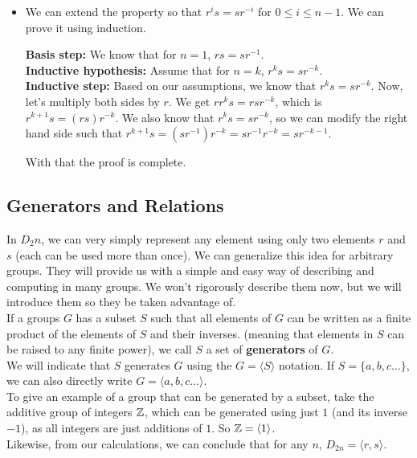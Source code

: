 \documentclass[12pt]{article}
\begin{document}
\begin{itemize}[label=$\diamond$]
        \item
            We can extend the property so that $r^is = sr^{-i}$
            for $0 \leqslant i \leqslant n-1$.
            We can prove it using induction. \\
            \begin{adjustwidth}{1cm}{1cm}
                \textbf{Basis step:}
                We know that for $n = 1$,
                $rs = sr^{-1}$. \\
                \textbf{Inductive hypothesis:}
                Assume that for $n = k$,
                $r^ks = sr^{-k}$. \\
                \textbf{Inductive step:}
                Based on our assumptions,
                we know that $r^ks = sr^{-k}$.
                Now, let's multiply both sides by $r$.
                We get $rr^ks = rsr^{-k}$,
                which is $r^{k+1}s = (rs)r^{-k}$.
                We also know that $r^ks = sr^{-k}$,
                so we can modify the right hand side such that
                $r^{k+1}s = (sr^{-1})r^{-k} = sr^{-1}r^{-k} = sr^{-k-1}$.
            \end{adjustwidth}
            With that the proof is complete. \\
    \end{itemize}


    \subsection*{Generators and Relations}

    In $D_2n$, we can very simply represent any element
    using only two elements $r$ and $s$
    (each can be used more than once).
    We can generalize this idea for arbitrary groups.
    They will provide us with a simple and easy way of describing
    and computing in many groups.
    We won't rigorously describe them now,
    but we will introduce them so they be taken advantage of. \\

    If a groups $G$ has a subset $S$
    such that all elements of $G$ can be written as a finite
    product of the elements of $S$ and their inverses.
    (meaning that elements in $S$ can be raised to any finite power),
    we call $S$ a set of \textbf{generators} of $G$. \\
    We will indicate that $S$ generates $G$ using
    the $G = \langle S \rangle$ notation.
    If $S = \{a, b, c \dots\}$,
    we can also directly write $G = \langle a, b, c \dots \rangle$. \\
    To give an example of a group that can be generated by a subset,
    take the additive group of integers $\mathbb{Z}$,
    which can be generated using just $1$ (and its inverse $-1$),
    as all integers are just additions of $1$.
    So $\mathbb{Z} = \langle 1 \rangle$. \\
    Likewise, from our calculations,
    we can conclude that for any $n$, $D_{2n} = \langle r, s \rangle$. \\
\end{document}
